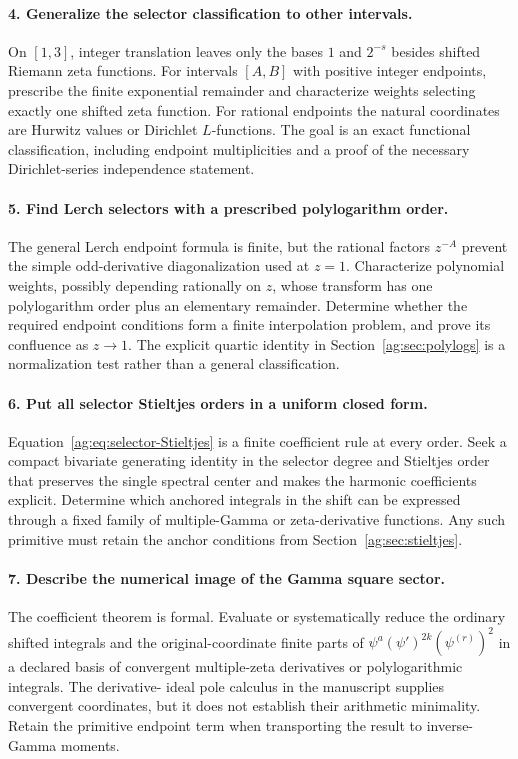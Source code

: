 \paragraph{4. Generalize the selector classification to other intervals.}
On $[1,3]$, integer translation leaves only the bases $1$ and $2^{-s}$
besides shifted Riemann zeta functions. For intervals $[A,B]$ with
positive integer endpoints, prescribe the finite exponential remainder
and characterize weights selecting exactly one shifted zeta function.
For rational endpoints the natural coordinates are Hurwitz values or
Dirichlet $L$-functions. The goal is an exact functional classification,
including endpoint multiplicities and a proof of the necessary
Dirichlet-series independence statement.

\paragraph{5. Find Lerch selectors with a prescribed polylogarithm order.}
The general Lerch endpoint formula is finite, but the rational factors
$z^{-A}$ prevent the simple odd-derivative diagonalization used at $z=1$.
Characterize polynomial weights, possibly depending rationally on $z$,
whose transform has one polylogarithm order plus an elementary
remainder. Determine whether the required endpoint conditions form a
finite interpolation problem, and prove its confluence as $z\to1$.
The explicit quartic identity in Section~\ref{ag:sec:polylogs} is a
normalization test rather than a general classification.

\paragraph{6. Put all selector Stieltjes orders in a uniform closed form.}
Equation~\eqref{ag:eq:selector-Stieltjes} is a finite coefficient rule
at every order. Seek a compact bivariate generating identity in the
selector degree and Stieltjes order that preserves the single spectral
center and makes the harmonic coefficients explicit. Determine which
anchored integrals in the shift can be expressed through a fixed family
of multiple-Gamma or zeta-derivative functions. Any such primitive must
retain the anchor conditions from Section~\ref{ag:sec:stieltjes}.

\paragraph{7. Describe the numerical image of the Gamma square sector.}
The coefficient theorem is formal. Evaluate or systematically reduce
the ordinary shifted integrals and the original-coordinate finite parts
of $\psi^a(\psi')^{2k}(\psi^{(r)})^2$ in a declared basis of convergent
multiple-zeta derivatives or polylogarithmic integrals. The derivative-
ideal pole calculus in the manuscript supplies convergent coordinates,
but it does not establish their arithmetic minimality. Retain the
primitive endpoint term when transporting the result to inverse-Gamma
moments.

